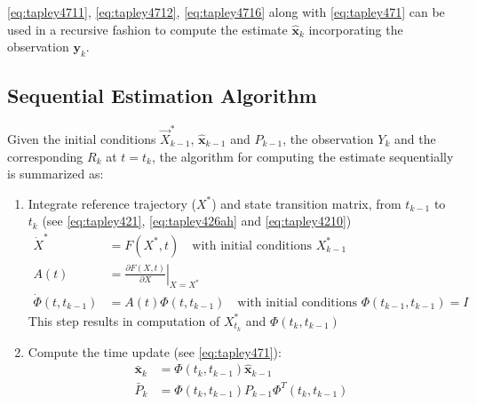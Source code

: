 \ref{eq:tapley4711}, \ref{eq:tapley4712}, \ref{eq:tapley4716} along with \ref{eq:tapley471} can be used in a recursive fashion to compute the estimate \(\hat{\bm{x}}_k\)
incorporating the observation \(\bm{y}_k\).

\subsection{Sequential Estimation Algorithm}
\label{ssec:sequential-estimation-algorithm}
Given the initial conditions \(\vec{X}^*_{k-1}\), \(\hat{\bm{x}}_{k-1}\) and \(P_{k-1}\),
the observation \(Y_k\) and the corresponding \(R_k\) at \(t=t_k\), the algorithm
for computing the estimate sequentially is summarized as:
\begin{enumerate}
	\item \label{en:kalman-wf-item1} Integrate reference trajectory (\(X^*\)) and
	      state transition matrix, from \(t_{k-1}\) to \(t_k\) (see \ref{eq:tapley421}, \ref{eq:tapley426ah} and \ref{eq:tapley4210})
	      \begin{subequations}
		      \begin{align}
			      \dot{X}^*               & = F( X^* , t )
			      \quad \text{with initial conditions } X^*_{k-1} \label{eq:tapley4717a} \\
			      A(t)                    & =
			      \left.\frac{\partial F(X,t)}{\partial X}\right|_{X=X^*}                \\
			      \dot{\Phi} (t, t_{k-1}) & =
			      A(t) \Phi (t,t_{k-1})
			      \quad \text{with initial conditions } \Phi(t_{k-1}, t_{k-1}) = I\label{eq:tapley4717b}
		      \end{align}
	      \end{subequations}
	      This step results in computation of \(X^*_{t_k}\) and \(\Phi (t_k, t_{k-1})\)

	\item \label{en:kalman-wf-time-update} Compute the time update (see \ref{eq:tapley471}):
	      \begin{subequations}
		      \begin{align}
			      \bar{\bm{x}}_k & = \Phi (t_k , t_{k-1}) \hat{\bm{x}}_{k-1}              \\
			      \bar{P}_k      & = \Phi (t_k , t_{k-1}) P_{k-1} \Phi ^T (t_k , t_{k-1})
		      \end{align}
	      \end{subequations}


\end{enumerate}
